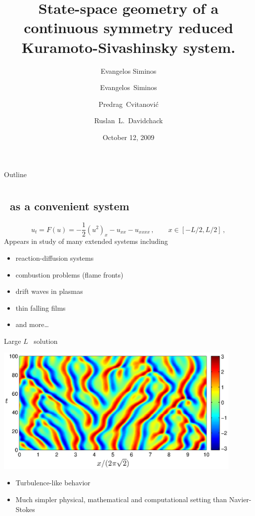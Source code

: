 \documentclass{beamer}
\title{State-space geometry of a continuous symmetry reduced Kuramoto-Sivashinsky system.}
\author{Evangelos Siminos}
\author[Siminos, Cvitanovi\'c, Davidchack]
{
  \textcolor{green!50!black}{Evangelos~Siminos}\inst{1,2} \and
  {Predrag~Cvitanovi\'c}\inst{2} \and
  {Ruslan~L.~Davidchack}\inst{3}
}
\institute
{
  \inst{1}
  CEA/DAM/DIF %
  \and
  \vskip-2mm
  \inst{2}%
  Georgia Institute of Technology, USA
  \and
  \vskip-2mm
  \inst{3}%
  University of Leicester, United Kingdom
}
\date{October 12, 2009}
\begin{document}
\begin{frame}
  \titlepage
\end{frame}

\begin{frame}{Outline}
  \tableofcontents
\end{frame}


\section[KSe]{\KSe}

\subsection{\KSe\ as a convenient system}
\begin{frame}{\KSe}
\[
  u_t = F(u) = -{\textstyle\frac{1}{2}}(u^2)_x-u_{xx}-u_{xxxx}
    \,,\qquad   x \in [-L/2,L/2]
    \,, 
\]
Appears in study of many extended systems including
\begin{itemize}
 \item reaction-diffusion systems
 \item combustion problems (flame fronts)
 \item drift waves in plasmas
 \item thin falling films
 \item and more\ldots
\end{itemize}

\end{frame}

\begin{frame}{Large $L$ \KSe\ solution}

\begin{center}
  \includegraphics[width=0.9\textwidth,height=0.5\textheight,clip=true]{../../figs/ks_largeL_cbar.eps}
\end{center}

\begin{itemize}
\item Turbulence-like behavior
\item Much simpler physical, mathematical and computational setting than Navier-Stokes  
\end{itemize}

\end{frame}
\end{document}
